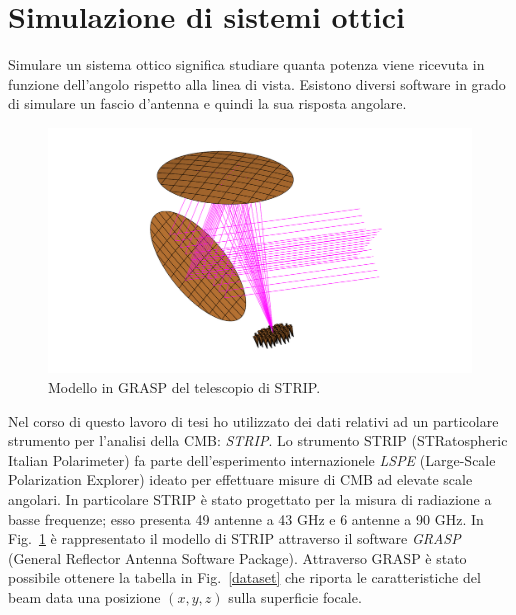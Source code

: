 \documentclass[12pt,a4paper,final]{book}
\begin{document}

\section{Simulazione di sistemi ottici}\label{simulazioni}
Simulare un sistema ottico significa studiare quanta potenza viene ricevuta in funzione dell'angolo rispetto alla linea di vista. 
Esistono diversi software in grado di simulare un fascio d'antenna e quindi la sua risposta angolare.

\begin{figure}[!ht]
	\centering
	\includegraphics[width=0.6\linewidth]{../figures/strip.png}
	\caption{Modello in GRASP del telescopio di STRIP.}
	\label{strip}
\end{figure}

Nel corso di questo lavoro di tesi ho utilizzato dei dati relativi ad un particolare strumento per l'analisi della CMB: \textit{STRIP}.
Lo strumento STRIP (STRatospheric Italian Polarimeter) fa parte dell'esperimento internazionele \textit{LSPE} (Large-Scale Polarization Explorer) ideato per effettuare misure di CMB ad elevate scale angolari.
In particolare STRIP è stato progettato per la misura di radiazione a basse frequenze; esso presenta 49 antenne a 43 GHz e 6 antenne a 90 GHz. In Fig.~\ref{strip} è rappresentato il modello di STRIP attraverso il software \textit{GRASP} (General Reflector Antenna Software Package).
Attraverso GRASP è stato possibile ottenere la tabella in Fig.~\ref{dataset} che riporta le caratteristiche del beam data una posizione $(x, y, z)$ sulla superficie focale.
\end{document}
